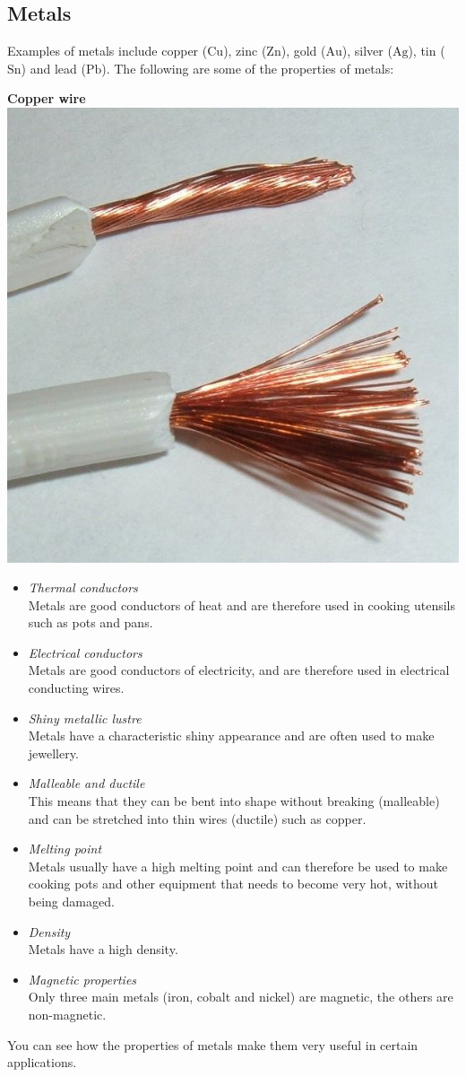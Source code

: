             \subsection*{Metals}
            \nopagebreak
\begin{minipage}{.5\textwidth}
        \label{m38708*id65726}Examples of metals include copper ($\text{Cu}$), zinc ($\text{Zn}$), gold ($\text{Au}$), silver ($\text{Ag}$), tin ($\text{Sn}$) and lead ($\text{Pb}$). The following are some of the properties of metals:\par 
\end{minipage}
\begin{minipage}{.5\textwidth}
\begin{center}
\textbf{Copper wire}\\
 \includegraphics[width=.2\textwidth]{photos/copperwire.jpg}
\end{center}
\end{minipage}

        \label{m38708*id65732}\begin{itemize}[noitemsep]
            \label{m38708*uid77}\item \textsl{Thermal conductors} \\
Metals are good conductors of heat and are therefore used in cooking utensils such as pots and pans.
\label{m38708*uid78}\item \textsl{Electrical conductors} \\
Metals are good conductors of electricity, and are therefore used in electrical conducting wires.
\label{m38708*uid79}\item \textsl{Shiny metallic lustre} \\
Metals have a characteristic shiny appearance and are often used to make jewellery.
\label{m38708*uid80}\item \textsl{Malleable and ductile} \\
This means that they can be bent into shape without breaking (malleable) and can be stretched into thin wires (ductile) such as copper.
\label{m38708*uid81}\item \textsl{Melting point} \\
Metals usually have a high melting point and can therefore be used to make cooking pots and other equipment that needs to become very hot, without being damaged.
\label{m38708*uid82}\item \textsl{Density} \\
Metals have a high density.
\item \textsl{Magnetic properties} \\ 
Only three main metals (iron, cobalt and nickel) are magnetic, the others are non-magnetic.
\end{itemize}
         \label{m38708*id65852}You can see how the properties of metals make them very useful in certain applications.

